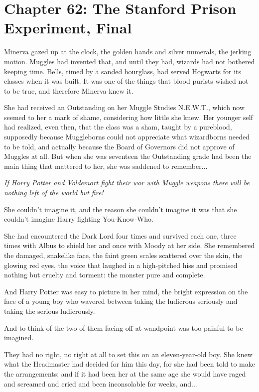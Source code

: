 \chapter{Chapter 62: The Stanford Prison Experiment, Final}
Minerva gazed up at the clock, the golden hands and silver numerals, the
jerking motion. Muggles had invented that, and until they had, wizards
had not bothered keeping time. Bells, timed by a sanded hourglass, had
served Hogwarts for its classes when it was built. It was one of the
things that blood purists wished not to be true, and therefore Minerva
knew it.

She had received an Outstanding on her Muggle Studies N.E.W.T., which
now seemed to her a mark of shame, considering how little she knew. Her
younger self had realized, even then, that the class was a sham, taught
by a pureblood, supposedly because Muggleborns could not appreciate what
wizardborns needed to be told, and actually because the Board of
Governors did not approve of Muggles at all. But when she was seventeen
the Outstanding grade had been the main thing that mattered to her, she
was saddened to remember...

\emph{If Harry Potter and Voldemort fight their war with Muggle weapons
there will be nothing left of the world but fire!}

She couldn't imagine it, and the reason she couldn't imagine it was that
she couldn't imagine Harry fighting You-Know-Who.

She had encountered the Dark Lord four times and survived each one,
three times with Albus to shield her and once with Moody at her side.
She remembered the damaged, snakelike face, the faint green scales
scattered over the skin, the glowing red eyes, the voice that laughed in
a high-pitched hiss and promised nothing but cruelty and torment: the
monster pure and complete.

And Harry Potter was easy to picture in her mind, the bright expression
on the face of a young boy who wavered between taking the ludicrous
seriously and taking the serious ludicrously.

And to think of the two of them facing off at wandpoint was too painful
to be imagined.

They had no right, no right at all to set this on an eleven-year-old
boy. She knew what the Headmaster had decided for him this day, for she
had been told to make the arrangements; and if it had been her at the
same age she would have raged and screamed and cried and been
inconsolable for weeks, and...

